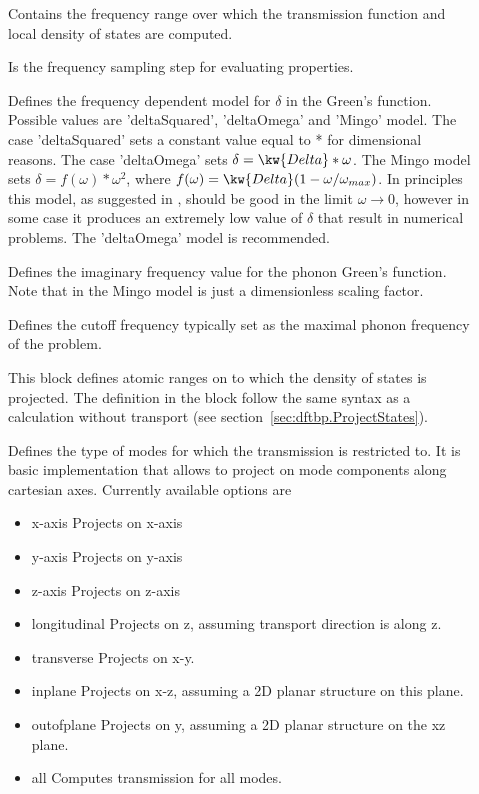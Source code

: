 \begin{description}
\item[] Contains the frequency range over
  which the transmission function and local density of states are computed.
\item[] Is the frequency sampling step for
  evaluating properties.
\item[] Defines the frequency dependent model for $\delta$ in the
	Green's function. Possible values are 'deltaSquared', 'deltaOmega' and 
	'Mingo' model. 
    The case 'deltaSquared' sets a constant value equal to *
    for dimensional reasons.
    The case 'deltaOmega' sets $\delta= \kw{Delta}* \omega$.
    The Mingo model sets $\delta=f(\omega)*\omega^2$, where 
    $f(\omega)=\kw{Delta}(1-\omega/\omega_{max})$. In principles this model, as
    suggested in \cite{Mingo}, should be good in the limit $\omega \rightarrow 0$, however
    in some case it produces an extremely low value of $\delta$ that result in
    numerical problems. The 'deltaOmega' model is recommended.
\item[] Defines the imaginary frequency value 
	for the phonon Green's function. Note that in the Mingo model  
	is just a dimensionless scaling factor.
\item[] Defines the cutoff frequency typically 
	set as the maximal phonon frequency of the problem.
\item[] \label{pRegion} This block defines atomic ranges on to which the  
	density of states is projected. 
	The definition in the block follow the same syntax as a \dftbp{} calculation without 
	transport (see section~\ref{sec:dftbp.ProjectStates}).
\item[] Defines the type of modes for which the transmission is restricted to.
	It is basic implementation that allows to project on mode components along 
	cartesian axes. Currently available options are\\
	\begin{itemize}
	  \item{x-axis} Projects on x-axis 
        \item{y-axis} Projects on y-axis 
        \item{z-axis} Projects on z-axis
        \item{longitudinal} Projects on z, assuming transport direction is along z.
        \item{transverse} Projects on x-y.
        \item{inplane} Projects on x-z, assuming a 2D planar structure on this plane.
        \item{outofplane} Projects on y, assuming a 2D planar structure on the xz plane.
        \item{all} Computes transmission for all modes.
      \end{itemize}
\end{description}

